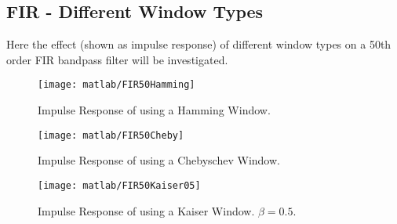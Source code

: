 \clearpage

\subsection{FIR - Different Window Types}
\label{sec:FIR_windows}
Here the effect (shown as impulse response) of different window types on a 50th order FIR bandpass filter will be investigated.

\begin{figure}[!htb]
	\centering
	\texttt{[image: matlab/FIR50Hamming]}
	\caption{Impulse Response of using a Hamming Window.}
	\label{fig:FIR_50Hamming}
\end{figure}

\begin{figure}[!htb]
	\centering
	\texttt{[image: matlab/FIR50Cheby]}
	\caption{Impulse Response of using a Chebyschev Window.}
	\label{fig:FIR_50Cheby}
\end{figure}

\begin{figure}[!htb]
	\centering
	\texttt{[image: matlab/FIR50Kaiser05]}
	\caption{Impulse Response of using a Kaiser Window. $\beta=0.5$.}
	\label{fig:FIR_50Kaiser}
\end{figure}

